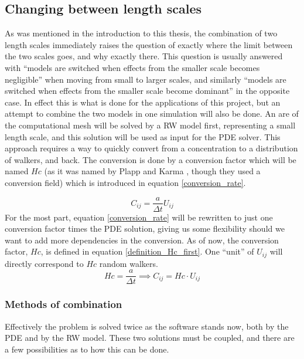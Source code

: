 \subsection{Changing between length scales}\label{theory:changing_between_lenghtscales}
As was mentioned in the introduction to this thesis, the combination of two length scales immediately raises the question of exactly where the limit between the two scales goes, and why exactly there. 
This question is usually answered with ``models are switched when effects from the smaller scale becomes negligible'' when moving from small to larger scales, and similarly ``models are switched when effects from the smaller scale become dominant'' in the opposite case. 
In effect this is what is done for the applications of this project, but an attempt to combine the two models in one simulation will also be done. 
An are of the computational mesh will be solved by a RW model first, representing a small length scale, and this solution will be used as input for the PDE solver. 
This approach requires a way to quickly convert from a concentration to a distribution of walkers, and back. 
The conversion is done by a conversion factor which will be named $Hc$ (as it was named by Plapp and Karma \cite{plapp2000multiscale}, though they used a conversion field) which is introduced in equation \eqref{conversion_rate}. 

\begin{equation}\label{conversion_rate}
 C_{ij} = \frac{a}{\Delta t}U_{ij}
\end{equation}
For the most part, equation \eqref{conversion_rate}  will be rewritten to just one conversion factor times the PDE solution, giving us some flexibility should we want to add more dependencies in the conversion. 
As of now, the conversion factor, $Hc$, is defined in equation \eqref{definition_Hc_first}. 
One ``unit'' of $ U_{ij}$ will directly correspond to $Hc$ random walkers.
\begin{equation}\label{definition_Hc_first}
 Hc =  \frac{a}{\Delta t} \implies C_{ij} = Hc\cdot U_{ij}
\end{equation}

\subsubsection{Methods of combination}
Effectively the problem is solved twice as the software stands now, both by the PDE and by the RW model. These two solutions must be coupled, and there are a few possibilities as to how this can be done.

